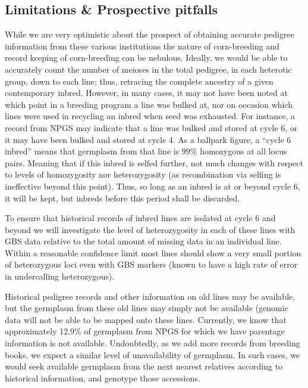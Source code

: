 \documentclass[12pt]{article}
\begin{document}
\subsection*{Limitations \& Prospective pitfalls}
While we are very optimistic about the prospect of obtaining accurate pedigree information from these various institutions the nature of corn-breeding and record keeping of corn-breeding can be nebulous. Ideally, we would be able to accurately count the number of meioses in the total pedigree, in each heterotic group, down to each line; thus, retracing the complete ancestry of a given contemporary inbred. However, in many cases, it may not have been noted at which point in a breeding program a line was bulked at, nor on occasion which lines were used in recycling an inbred when seed was exhausted. For instance, a record from NPGS may indicate that a line was bulked and stored at cycle 6, or it may have been bulked and stored at cycle 4. As a ballpark figure, a ``cycle 6 inbred'' means that germplasm from that line is 99\% homozygous at all locus pairs. Meaning that if this inbred is selfed further, not much changes with respect to levels of homozygosity nor heterozygosity (as recombination via selfing is ineffective beyond this point).  Thus, so long as an inbred is at or beyond cycle 6, it will be kept, but inbreds before this period shall be discarded.

\par To ensure that historical records of inbred lines are isolated at cycle 6 and beyond we will investigate the level of heterozygosity in each of these lines with GBS data relative to the total amount of missing data in an individual line. Within a reasonable confidence limit most lines should show a very small portion of heterozygous loci even with GBS markers (known to have a high rate of error in undercalling heterozygous). 

\par Historical pedigree records and other information on old lines may be available, but the germplasm from these old lines may simply not be available (genomic data will not be able to be mapped onto these lines. Currently, we know that approximately 12.9\% of germplasm from NPGS for which we have parentage information is not available. Undoubtedly, as we add more records from breeding books, we expect a similar level of unavailability of germplasm.  In such cases, we would seek available germplasm from the next nearest relatives according to historical information, and genotype those accessions. 
\end{document}
